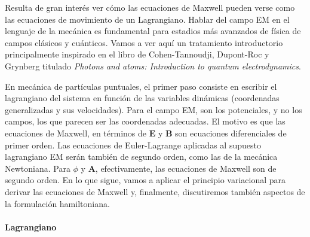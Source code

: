Resulta de gran interés ver cómo las ecuaciones de Maxwell pueden verse como las ecuaciones de movimiento de un Lagrangiano. Hablar del campo EM en el lenguaje de la mecánica es fundamental para estadios más avanzados de física de campos clásicos y cuánticos. Vamos a ver aquí un tratamiento introductorio principalmente inspirado en el libro de Cohen-Tannoudji, Dupont-Roc y Grynberg titulado \textit{Photons and atoms: Introduction to quantum electrodynamics}.

En mecánica de partículas puntuales, el primer paso consiste en escribir el lagrangiano del sistema en función de las variables dinámicas (coordenadas generalizadas y sus velocidades). Para el campo EM, son los potenciales, y no los campos, los que parecen ser las coordenadas adecuadas. El motivo es que las ecuaciones de Maxwell, en términos de \(\mathbf{E}\) y \(\mathbf{B}\) son ecuaciones diferenciales de primer orden. Las ecuaciones de Euler-Lagrange aplicadas al supuesto lagrangiano EM serán también de segundo orden, como las de la mecánica Newtoniana. Para \(\phi\) y \(\mathbf{A}\), efectivamente, las ecuaciones de Maxwell son de segundo orden. En lo que sigue, vamos a aplicar el principio variacional para derivar las ecuaciones de Maxwell y, finalmente, discutiremos también aspectos de la formulación hamiltoniana.

\paragraph{Lagrangiano}

